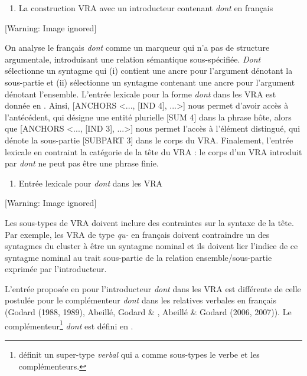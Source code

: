 \begin{enumerate}
\item La construction VRA avec un introducteur contenant \textit{dont} en français  


\end{enumerate}
  [Warning: Image ignored] %
 

On analyse le français \textit{dont} comme un marqueur qui n'a pas de structure argumentale, introduisant une relation sémantique sous-spécifiée. \textit{Dont} sélectionne un syntagme qui (i) contient une ancre pour l'argument dénotant la sous-partie et (ii) sélectionne un syntagme contenant une ancre pour l'argument dénotant l'ensemble. L'entrée lexicale pour la forme \textit{dont} dans les VRA est donnée en . Ainsi, [ANCHORS {\textless}..., [IND 4], ...{\textgreater}] nous permet d'avoir accès à l'antécédent, qui désigne une entité plurielle [SUM 4] dans la phrase hôte, alors que [ANCHORS {\textless}..., [IND 3], ...{\textgreater}] nous permet l'accès à l'élément distingué, qui dénote la sous-partie [SUBPART 3] dans le corps du VRA. Finalement, l'entrée lexicale en  contraint la catégorie de la tête du VRA : le corps d'un VRA introduit par \textit{dont} ne  peut pas être une phrase finie.


\begin{enumerate}
\item \label{bkm:Ref299034743}Entrée lexicale pour \textit{dont} dans les VRA 


\end{enumerate}
  [Warning: Image ignored] %
 

Les sous-types de VRA doivent inclure des contraintes sur la syntaxe de la tête. Par exemple, les VRA de type \textit{qu-} en français doivent contraindre un des syntagmes du cluster à être un syntagme nominal et ils doivent lier l'indice de ce syntagme nominal au trait sous-partie de la relation ensemble/sous-partie exprimée par l'introducteur.

L'entrée proposée en  pour l'introducteur \textit{dont} dans les VRA est différente de celle postulée pour le complémenteur \textit{dont} dans les relatives verbales en français (Godard (1988, 1989), Abeillé, Godard \& \citet{Sag2003}, Abeillé \& Godard (2006, 2007)). Le complémenteur\footnote{\citet{Sag1997} définit un super-type \textit{verbal} qui a comme sous-types le verbe et les complémenteurs.} \textit{dont} est défini en .


